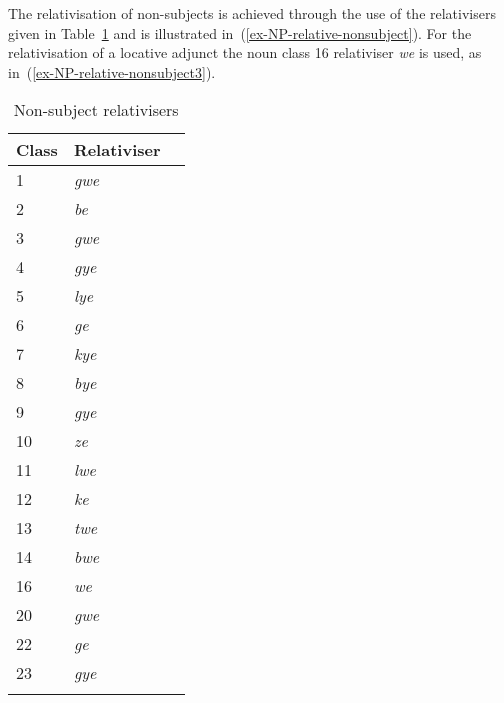 The relativisation of non-subjects is achieved through the use of the relativisers given in Table~\ref{tab-relativiser} and is illustrated in~(\ref{ex-NP-relative-nonsubject}).
For the relativisation of a locative adjunct the noun class 16 relativiser \emph{we} is used, as in~(\ref{ex-NP-relative-nonsubject3}).

\begin{table}[!h]

\caption{Non-subject relativisers}
\label{tab-relativiser}
	\begin{tabular}{lll}
\lsptoprule
Class & Relativiser\\
\midrule
1 & \emph{gwe}\\
2 & \emph{be}\\
3 & \emph{gwe}\\
4 & \emph{gye}\\
5 & \emph{lye}\\
6 & \emph{ge}\\
7 & \emph{kye}\\
8 & \emph{bye}\\
9 & \emph{gye}\\
10 & \emph{ze}\\
11 & \emph{lwe}\\
12 & \emph{ke}\\
13 & \emph{twe}\\
14 & \emph{bwe}\\
16 & \emph{we}\\
20 & \emph{gwe}\\
22 & \emph{ge}\\
23 & \emph{gye} &\\
\lspbottomrule
	\end{tabular}
\end{table}

